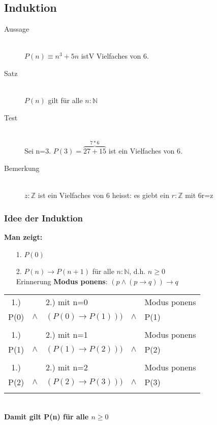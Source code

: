 \documentclass[a4paper,10pt]{article}
\newcommand{\NN}{\mathbb{N}} %
\newcommand{\ZN}{\mathbb{Z}} %
\newcommand{\Bold}[1]{\textbf{#1}} %
\newcommand{\ra}{\rightarrow}
\begin{document}
\subsection{Induktion}
\begin{description}
	\item[Aussage] \hfill \\
		$P(n) \equiv n^3 +5n$ istV Vielfaches von 6.
	\item[Satz] \hfill \\
		$P(n)$ gilt f\"ur alle $n:\NN$
	\item[Test] \hfill \\
		Sei n=3. $P(3) = \overbrace{27+15}^{7*6}$ ist ein Vielfaches von 6.
	\item[Bemerkung] \hfill \\
		$z:\ZN$ ist ein Vielfaches von 6 heisst: es giebt ein $r:\ZN$ mit 6r=z
\end{description}

\subsubsection{Idee der Induktion}
\Bold {Man zeigt:}
\begin{itemize}
	\item[1.] $P(0)$
	\item[2.] $P(n) \ra P(n+1)$ f\"ur alle $n:\NN$, d.h. $n\geq 0$ \\
		Erinnerung \Bold {Modus ponens}: $(p \wedge (p \ra q))\ra q$
\end{itemize}
\begin{tabular}{ c c l c l}
1.) & & 2.) mit n=0 & & Modus ponens \\
P(0) & $\wedge$ & $(P(0) \ra P(1)))$ & $\wedge$ & P(1) \\ \\
1.) & & 2.) mit n=1 & & Modus ponens \\
P(1) & $\wedge$ & $(P(1) \ra P(2)))$ & $\wedge$ & P(2) \\ \\
1.) & & 2.) mit n=2 & & Modus ponens \\
P(2) & $\wedge$ & $(P(2) \ra P(3)))$ & $\wedge$ & P(3) \\ \\
\end{tabular} \\
\Bold {Damit gilt P(n) f\"ur alle $n \geq 0$}
\end{document}
